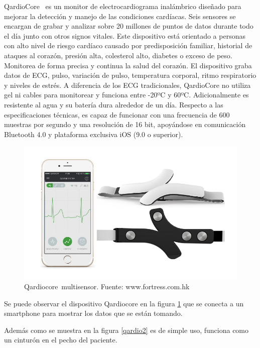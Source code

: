 QardioCore\textregistered\ \cite{qardio} es un monitor de electrocardiograma inalámbrico diseñado para mejorar la detección y manejo de las condiciones cardíacas. Seis sensores se encargan de grabar y analizar sobre 20 millones de puntos de datos durante todo el día junto con otros signos vitales. Este dispositivo está orientado a personas con alto nivel de riesgo cardíaco causado por predisposición familiar, historial de ataques al corazón, presión alta, colesterol alto, diabetes o exceso de peso. Monitorea de forma precisa y continua la salud del corazón. El dispositivo graba datos de ECG, pulso, variación de pulso, temperatura corporal, ritmo respiratorio y niveles de estrés. A diferencia de los ECG tradicionales, QardioCore no utiliza gel ni cables para monitorear y funciona entre -20ºC y 60ºC. Adicionalmente es resistente al agua y su batería dura alrededor de un día. Respecto a las especificaciones técnicas, es capaz de funcionar con una frecuencia de 600 muestras por segundo y una resolución de 16 bit, apoyándose en comunicación Bluetooth 4.0 y plataforma exclusiva iOS (9.0 o superior)\cite{qardio_tel}.

\begin{figure}[H]
	\centering
	\includegraphics[scale=0.5]{figuras/estadoarte/qardio/qardio.jpg}
	\caption{Qardiocore\textregistered\ multisensor. Fuente: www.fortress.com.hk}
	\label{qardio1}
\end{figure}

Se puede observar el dispositivo Qardiocore en la figura \ref{qardio1} que se conecta a un smartphone para mostrar los datos que se están tomando.

\newpage
Además como se muestra en la figura \ref{qardio2} es de simple uso, funciona como un cinturón en el pecho del paciente.


